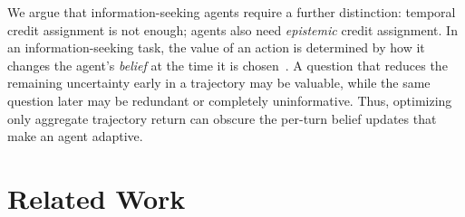 \documentclass[11pt]{article}
\newcommand{\an}[1]{\textcolor{black}{#1}}
\theoremstyle{plain}
\theoremstyle{definition}
\theoremstyle{remark}
\begin{document}
We argue that information-seeking agents require a further distinction: temporal credit assignment is not enough; agents also need \textit{epistemic} credit assignment. In an information-seeking task, the value of an action is determined by how it changes the agent’s \textit{belief} at the time it is chosen~\citep{kausik2026context}. A question that reduces the remaining uncertainty early in a trajectory may be valuable, while the same question later may be redundant or completely uninformative. Thus, optimizing only aggregate trajectory return can obscure the per-turn belief updates that make an agent adaptive.
\fi

 




 


\vspace*{-3mm}
\section{Related Work}
\end{document}
